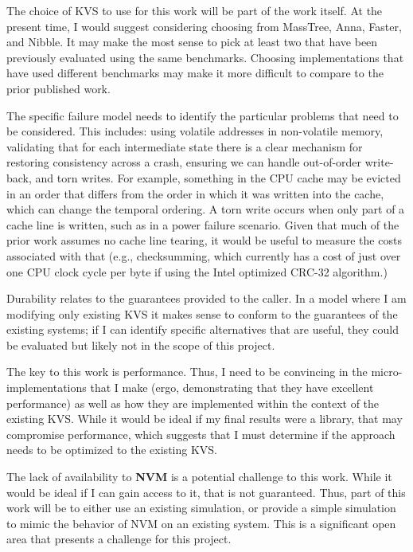 \documentclass[letterpaper,twocolumn,10pt]{article}
\begin{document}
The choice of KVS to use for this work will be part of the work itself.  At the present time, I would suggest considering choosing from MassTree,
Anna, Faster, and Nibble.  It may make the most sense to pick at least two that have been previously evaluated using the same benchmarks.  
Choosing implementations that have used different benchmarks may make it more difficult to compare to the prior published work.

The specific failure model needs to identify the particular problems that need to be considered.  This includes: using volatile addresses in
non-volatile memory, validating that for each intermediate state there is a clear mechanism for restoring consistency across a crash, ensuring we can
handle out-of-order write-back, and torn writes.  For example, something in the CPU cache may be evicted in an order that differs from the order in which 
it was written into the cache, which can change the temporal ordering.  A torn write occurs when only part of a cache line is written, such as in a power 
failure scenario.  Given that much of the prior work assumes no cache line tearing, it would be useful to measure the costs associated with that (e.g., 
checksumming, which currently has a cost of just over one CPU clock cycle per byte if using the Intel optimized CRC-32 algorithm.)

Durability relates to the guarantees provided to the caller.  In a model where I am modifying only existing KVS it makes sense to conform to the 
guarantees of the existing systems; if I can identify specific alternatives that are useful, they could be evaluated but likely not in the scope
of this project.

The key to this work is performance.  Thus, I need to be convincing in the micro-implementations that I make (ergo, demonstrating that they have excellent performance) as
well as how they are implemented within the context of the existing KVS.  While it would be ideal if my final results were a library, that may compromise performance, which
suggests that I must determine if the approach needs to be optimized to the existing KVS.

The lack of availability to \textbf{NVM} is a potential challenge to this work.  While it would be ideal if I can gain access to it, that is not guaranteed.  Thus, part of this work will be to either use an existing simulation, or provide a simple simulation to mimic the behavior of NVM on an existing system.   This is a significant open area
that presents a challenge for this project.
\end{document}
